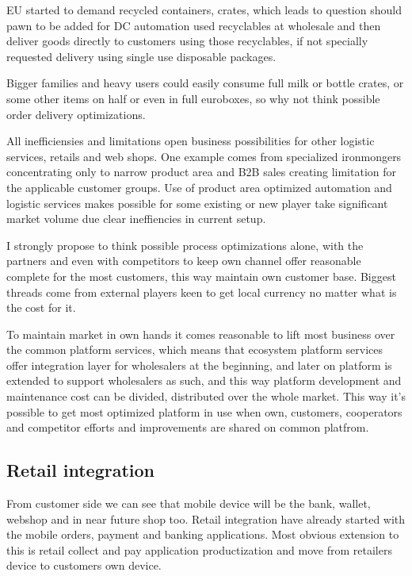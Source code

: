 EU started to demand recycled containers, crates, which leads to question
should pawn to be added for DC automation used recyclables at wholesale and
then deliver goods directly to customers using those recyclables, if not
specially requested delivery using single use disposable packages.

Bigger families and heavy users could easily consume full milk or bottle
crates, or some other items on half or even in full euroboxes, so why not
think possible order delivery optimizations.

All inefficiensies and limitations open business possibilities for other
logistic services, retails and web shops. One example comes from specialized
ironmongers concentrating only to narrow product area and B2B sales creating
limitation for the applicable customer groups. Use of product area optimized
automation and logistic services makes possible for some existing or new
player take significant market volume due clear ineffiencies in current setup.

I strongly propose to think possible process optimizations alone, with the
partners and even with competitors to keep own channel offer reasonable
complete for the most customers, this way maintain own customer base. Biggest
threads come from external players keen to get local currency no matter what
is the cost for it.

To maintain market in own hands it comes reasonable to lift most business over
the common platform services, which means that ecosystem platform services
offer integration layer for wholesalers at the beginning, and later on
platform is extended to support wholesalers as such, and this way platform
development and maintenance cost can be divided, distributed over the whole
market. This way it's possible to get most optimized platform in use when own,
customers, cooperators and competitor efforts and improvements are shared on
common platfrom.

\subsection{Retail integration}
\label{retail}
From customer side we can see that mobile device will be the bank, wallet,
webshop and in near future shop too. Retail integration have already started
with the mobile orders, payment and banking applications. Most obvious
extension to this is retail collect and pay application productization and
move from retailers device to customers own device.

